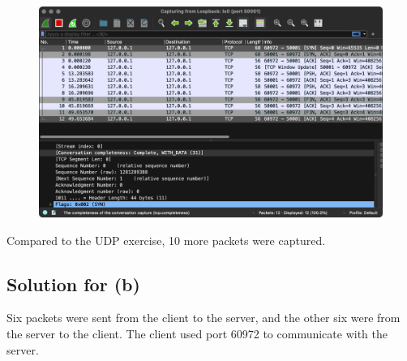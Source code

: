 \documentclass{scrartcl}
\begin{document}
\begin{figure}[H]
  \centering
  \includegraphics[width=0.8\linewidth]{prob4a}
\end{figure}

Compared to the UDP exercise, 10 more packets were captured.

\subsection{Solution for (b)}
Six packets were sent from the client to the server, and the other six were
from the server to the client. The client used port 60972 to communicate with
the server.
\end{document}
